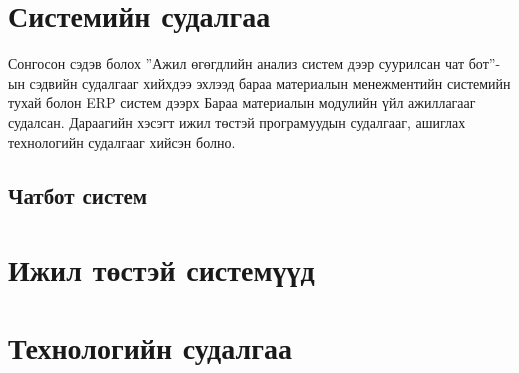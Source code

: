 \section{Системийн судалгаа}
Сонгосон сэдэв болох ”Ажил өгөгдлийн анализ систем дээр суурилсан чат бот”-ын сэдвийн судалгааг хийхдээ эхлээд бараа материалын менежментийн системийн тухай болон ERP систем дээрх Бараа материалын модулийн үйл ажиллагааг судалсан. Дараагийн хэсэгт ижил төстэй програмуудын судалгааг, ашиглах технологийн судалгааг хийсэн болно.
\subsection{Чатбот систем}

\section{Ижил төстэй системүүд}

\section{Технологийн судалгаа}